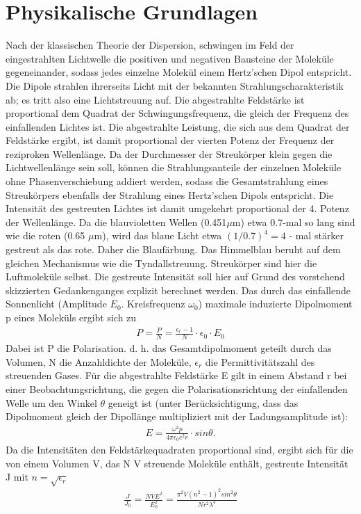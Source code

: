 \section{Physikalische Grundlagen}
Nach der klassischen Theorie der Dispersion, schwingen im Feld der eingestrahlten Lichtwelle die positiven und negativen Bausteine der Moleküle gegeneinander, sodass jedes einzelne Molekül einem Hertz'schen Dipol entspricht. Die Dipole strahlen ihrerseits Licht mit der bekannten Strahlungscharakteristik ab; es tritt also eine Lichtstreuung auf. Die abgestrahlte Feldstärke ist proportional dem Quadrat der Schwingungsfrequenz, die gleich der Frequenz des einfallenden Lichtes ist. Die abgestrahlte Leistung, die sich aus dem Quadrat der Feldstärke ergibt, ist damit proportional der vierten Potenz der Frequenz der reziproken Wellenlänge.
Da der Durchmesser der Streukörper klein gegen die Lichtwellenlänge sein soll, können die Strahlungsanteile der einzelnen Moleküle ohne Phasenverschiebung addiert werden, sodass die Gesamtstrahlung eines Streukörpers ebenfalls der Strahlung eines Hertz'schen Dipols entspricht. Die Intensität des gestreuten Lichtes ist damit umgekehrt proportional der 4. Potenz der Wellenlänge. Da die blauvioletten Wellen (0.451$\mu$m) etwa 0.7-mal so lang sind wie die roten (0.65 $\mu$m), wird das blaue Licht etwa $(1/0.7)^4 =4$ - mal stärker gestreut als das rote. Daher die Blaufärbung.
Das Himmelblau beruht auf dem gleichen Mechanismus wie die Tyndallstreuung.
Streukörper sind hier die Luftmoleküle selbst. Die gestreute Intensität soll hier auf Grund des vorstehend skizzierten Gedankenganges explizit berechnet werden.
Das durch das einfallende Sonnenlicht (Amplitude $E_0$. Kreisfrequenz $\omega_0$) maximale induzierte Dipolmoment p eines Moleküls ergibt sich zu
\begin{align}
P= \frac{P}{N} = \frac{\epsilon_r - 1}{N} \cdot \epsilon_0 \cdot 	E_0
\end{align}
Dabei ist P die Polarisation. d. h. das Gesamtdipolmoment geteilt durch das Volumen, N die Anzahldichte der Moleküle, $\epsilon_r$ die Permittivitätszahl des streuenden Gases. Für die abgestrahlte Feldstärke E gilt in einem Abstand r bei einer Beobachtungsrichtung, die gegen die Polarisationsrichtung der einfallenden Welle um den Winkel $\theta$ geneigt ist (unter Berücksichtigung, dass das Dipolmoment gleich der Dipollänge multipliziert mit der Ladungsamplitude ist):
\begin{align}
E= \frac{\omega^2 p}{4 \pi \epsilon_0 c^2 r} \cdot sin \theta.
\end{align}
Da die Intensitäten den Feldstärkequadraten proportional sind, ergibt sich für die von einem Volumen V, das N V streuende Moleküle enthält, gestreute Intensität J mit $n=\sqrt{\epsilon_r}$
\begin{align}
\frac{J}{J_0}= \frac{NVE^2}{E_0^2} =  \frac{\pi^2V(n^2-1)^2 sin^2\theta}{Nr^2\lambda^4}
\end{align}

